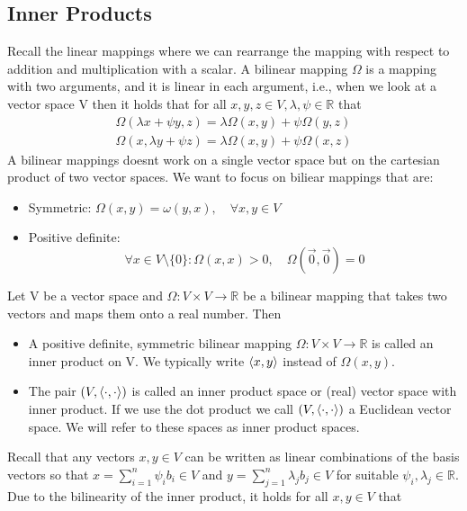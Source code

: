 \subsection{Inner Products}
Recall the linear mappings where we can rearrange the mapping with respect to addition and multiplication with a scalar. A bilinear mapping $\Omega$ is a mapping with two arguments, and it is linear in each argument, i.e., when we look at a vector space V then it holds that for all $x,y,z \in V, \lambda, \psi \in \mathbb{R}$ that
\begin{align*}
    \Omega(\lambda x+ \psi y, z) = \lambda\Omega(x,y) + \psi\Omega(y,z)\\
    \Omega(x,\lambda y+ \psi z) = \lambda\Omega(x,y) + \psi \Omega(x,z)
\end{align*}
A bilinear mappings doesnt work on a single vector space but on the cartesian product of two vector spaces. We want to focus on biliear mappings that are: \begin{itemize}
    \item Symmetric: $\Omega(x,y)= \omega(y,x), \quad \forall x,y \in V$
    \item Positive definite: \[ 
        \forall x \in V\setminus\{0\} : \Omega(x,x) >0, \quad \Omega(\vec{0},\vec{0})= 0
    \]
\end{itemize}
\begin{definition}
    Let V be a vector space and $\Omega: V \times V \longrightarrow \mathbb{R}$ be a bilinear mapping that takes two vectors and maps them onto a real number. Then
    \begin{itemize}
        \item A positive definite, symmetric bilinear mapping $\Omega: V \times V \longrightarrow \mathbb{R}$ is called an inner product on V. We typically write $\left\langle x,y\right\rangle$ instead of $\Omega(x,y)$.
        \item The pair $(V,\left\langle\cdot, \cdot\right\rangle)$ is called an inner product space or (real) vector space with inner product. If we use the dot product we call $(V,\left\langle\cdot, \cdot\right\rangle)$ a Euclidean vector space. We will refer to these spaces as inner product spaces. 
    \end{itemize}
\end{definition}
Recall that any vectors $x,y \in V$ can be written as linear combinations of the basis vectors so that $x = \sum_{i=1}^{n}{\psi_i b_i} \in V$ and $y = \sum_{j=1}^{n}{\lambda_j b_j} \in V$ for suitable $\psi_i,\lambda_j \in \mathbb{R}$. Due to the bilinearity of the inner product, it holds for all $x,y \in V$ that
